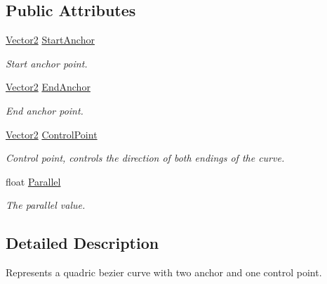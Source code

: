 \subsection*{Public Attributes}
\begin{DoxyCompactItemize}
\item 
\hyperlink{struct_open_t_k_1_1_vector2}{Vector2} \hyperlink{struct_open_t_k_1_1_bezier_curve_quadric_a6def7a3c3025026c39422238b0f3b721}{Start\-Anchor}
\begin{DoxyCompactList}\small\item\em Start anchor point. \end{DoxyCompactList}\item 
\hyperlink{struct_open_t_k_1_1_vector2}{Vector2} \hyperlink{struct_open_t_k_1_1_bezier_curve_quadric_a176ff3e32ed4a3551ffdefdfce284cd2}{End\-Anchor}
\begin{DoxyCompactList}\small\item\em End anchor point. \end{DoxyCompactList}\item 
\hyperlink{struct_open_t_k_1_1_vector2}{Vector2} \hyperlink{struct_open_t_k_1_1_bezier_curve_quadric_acf1d9d62b041dadefa2665f076165be9}{Control\-Point}
\begin{DoxyCompactList}\small\item\em Control point, controls the direction of both endings of the curve. \end{DoxyCompactList}\item 
float \hyperlink{struct_open_t_k_1_1_bezier_curve_quadric_af8a445547da095c74c25ac8c393eccfd}{Parallel}
\begin{DoxyCompactList}\small\item\em The parallel value. \end{DoxyCompactList}\end{DoxyCompactItemize}


\subsection{Detailed Description}
Represents a quadric bezier curve with two anchor and one control point. 



